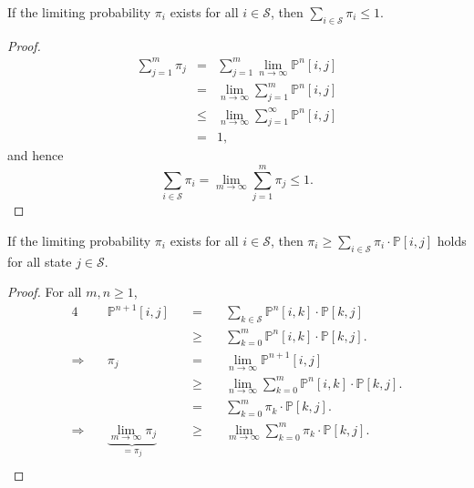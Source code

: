 \begin{inequality} \label{ineq:sum-pi-le-1}
If the limiting probability $ \pi_{i} $ exists for all $ i \in \mathcal{S} $, then $ \sum_{i \in \mathcal{S}} \pi_{i} \le 1 $.

\begin{proof}
\begin{eqnarray*}
\sum_{j = 1}^{m} \pi_{j}
  & = & \sum_{j = 1}^{m} \lim_{n \to \infty} \mathbb{P}^{n}[i, j] \\
  & = & \lim_{n \to \infty} \sum_{j = 1}^{m} \mathbb{P}^{n}[i, j] \\
  & \le & \lim_{n \to \infty} \sum_{j = 1}^{\infty} \mathbb{P}^{n}[i, j] \\
  & = & 1,
\end{eqnarray*}
and hence
\[ \sum_{i \in \mathcal{S}} \pi_{i} = \lim_{m \to \infty} \sum_{j = 1}^{m} \pi_{j} \le 1. \]
\end{proof}
\end{inequality}

\begin{inequality} \label{ineq:pi-ge-pi-times-p}
If the limiting probability $ \pi_{i} $ exists for all $ i \in \mathcal{S} $, then $ \pi_{i} \ge \sum_{i \in \mathcal{S}} \pi_{i} \cdot \mathbb{P}[i, j] $ holds for all state $ j \in \mathcal{S} $.

\begin{proof}
For all $ m, n \ge 1 $,
\begin{alignat*}{4}
  & \mathbb{P}^{n + 1}[i, j]
    & \quad=\quad & \sum_{k \in \mathcal{S}} \mathbb{P}^{n}[i, k] \cdot \mathbb{P}[k, j] \\
  & & \quad\ge\quad & \sum_{k = 0}^{m} \mathbb{P}^{n}[i, k] \cdot \mathbb{P}[k, j]. \\
\Rightarrow\quad
  & \pi_{j}
    & \quad=\quad & \lim_{n \to \infty} \mathbb{P}^{n + 1}[i, j] \\
  & & \quad\ge\quad & \lim_{n \to \infty} \sum_{k = 0}^{m} \mathbb{P}^{n}[i, k] \cdot \mathbb{P}[k, j]. \\
  & & \quad=\quad & \sum_{k = 0}^{m} \pi_{k} \cdot \mathbb{P}[k, j]. \\
\Rightarrow\quad
  & \underbrace{\lim_{m \to \infty} \pi_{j}}_{= \pi_{j}}
    & \quad\ge\quad & \lim_{m \to \infty} \sum_{k = 0}^{m} \pi_{k} \cdot \mathbb{P}[k, j]. \\
\end{alignat*}
\end{proof}
\end{inequality}

